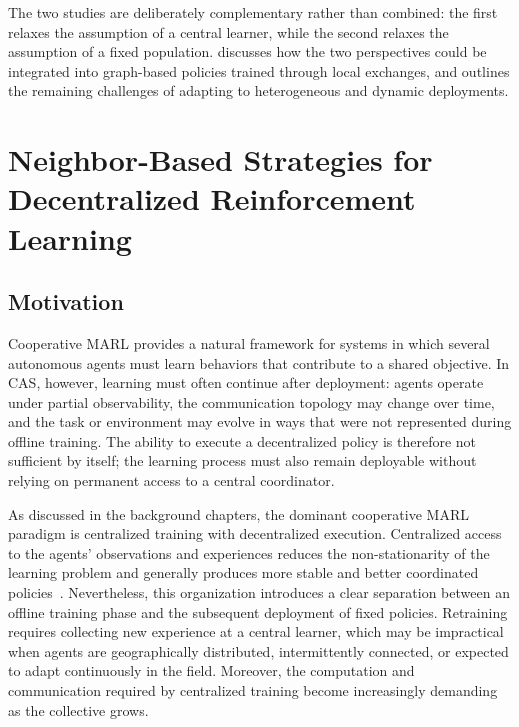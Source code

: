 The two studies are deliberately complementary rather than combined:
 the first relaxes the assumption of a central learner,
 while the second relaxes the assumption of a fixed population.
 discusses how the two perspectives could be integrated
 into graph-based policies trained through local exchanges,
 and outlines the remaining challenges of adapting to heterogeneous and dynamic deployments.

\section{Neighbor-Based Strategies for Decentralized Reinforcement Learning}
\label{sec:scalable-rl-neighbor}

\subsection{Motivation}
Cooperative \gls{MARL} provides a natural framework for
 systems in which several autonomous agents must learn behaviors that contribute
 to a shared objective.
%
In \gls{CAS}, however, 
 learning must often continue after deployment: 
 agents operate under partial observability, the communication topology may change over time, 
 and the task or environment may evolve in ways that were not represented during offline training.
%
The ability to execute a decentralized policy is therefore not sufficient by itself; 
 the learning process must also remain deployable without relying on
 permanent access to a central coordinator.

As discussed in the background chapters, 
 the dominant cooperative \gls{MARL} paradigm is centralized training with decentralized execution.
%
Centralized access to the agents' observations 
 and experiences reduces the non-stationarity of the learning problem 
 and generally produces more stable and better coordinated
 policies~\cite{DBLP:conf/nips/LoweWTHAM17,DBLP:conf/icml/RashidSWFFW18,DBLP:conf/icml/SonKKHY19}.
%
Nevertheless, 
 this organization introduces a clear separation between an offline training phase 
 and the subsequent deployment of fixed policies.
%
Retraining requires collecting new experience at a central learner, 
 which may be impractical when agents are geographically distributed, intermittently connected,
 or expected to adapt continuously in the field.
%
Moreover, 
 the computation and communication required by centralized training
 become increasingly demanding as the collective grows.

